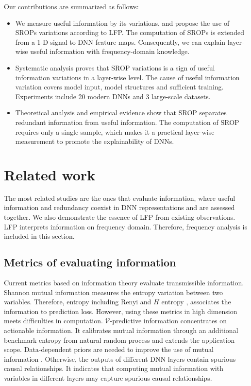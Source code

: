 \documentclass{article}
\begin{document}
Our contributions are summarized as follows:
\begin{itemize}
    \item We measure useful information by its variations, and propose the use of SROPs variations according to LFP. The computation of SROPs is extended from a 1-D signal to DNN feature maps. Consequently, we can explain layer-wise useful information with frequency-domain knowledge.
    \item Systematic analysis proves that SROP variations is a sign of useful information variations in a layer-wise level. The cause of useful information variation covers model input, model structures and sufficient training. Experiments include 20 modern DNNs and 3 large-scale datasets.
    \item Theoretical analysis and empirical evidence show that SROP separates redundant information from useful information. The computation of SROP requires only a single sample, which makes it a practical layer-wise measurement to promote the explainability of DNNs.
\end{itemize}
\section{Related work}
\label{sec:related_work}
The most related studies are the ones that evaluate information, where useful information and redundancy coexist in DNN representations and are assessed together. We also demonstrate the essence of LFP from existing observations. LFP interprets information on frequency domain. Therefore, frequency analysis is included in this section. 
\subsection{Metrics of evaluating information} Current metrics based on information theory evaluate transmissible information. Shannon mutual information measures the entropy variation between two variables. Therefore, entropy including Renyi and $H$ entropy \cite{h_entropy,renyi}, associates the information to prediction loss. However, using these metrics in high dimension meets difficulties in computation. $\mathcal{V}$-predictive information \cite{A_Theory_of_Usable_Information_under_Computational_Constraints} concentrates on actionable information. It calibrates mutual information through an additional benchmark entropy from natural random process and extends the application scope. Data-dependent priors are needed to improve the use of mutual information \cite{NEURIPS2019_05ae14d7}. Otherwise, the outputs of different DNN layers contain spurious causal relationships. It indicates that computing mutual information with variables in different layers may capture spurious causal relationships.
\end{document}
